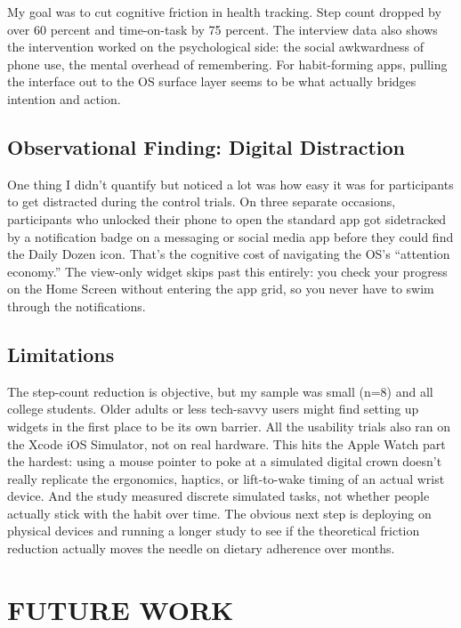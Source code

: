 \documentclass[10pt,twocolumn]{article}
\begin{document}
My goal was to cut cognitive friction in health tracking. Step count dropped by over 60 percent and time-on-task by 75 percent. The interview data also shows the intervention worked on the psychological side: the social awkwardness of phone use, the mental overhead of remembering. For habit-forming apps, pulling the interface out to the OS surface layer seems to be what actually bridges intention and action.

\subsection{Observational Finding: Digital Distraction}

One thing I didn't quantify but noticed a lot was how easy it was for participants to get distracted during the control trials. On three separate occasions, participants who unlocked their phone to open the standard app got sidetracked by a notification badge on a messaging or social media app before they could find the Daily Dozen icon. That's the cognitive cost of navigating the OS's ``attention economy.''\cite{HayesSirensCall} The view-only widget skips past this entirely: you check your progress on the Home Screen without entering the app grid, so you never have to swim through the notifications.

\subsection{Limitations}

The step-count reduction is objective, but my sample was small (n=8) and all college students. Older adults or less tech-savvy users might find setting up widgets in the first place to be its own barrier. All the usability trials also ran on the Xcode iOS Simulator, not on real hardware. This hits the Apple Watch part the hardest: using a mouse pointer to poke at a simulated digital crown doesn't really replicate the ergonomics, haptics, or lift-to-wake timing of an actual wrist device. And the study measured discrete simulated tasks, not whether people actually stick with the habit over time. The obvious next step is deploying on physical devices and running a longer study to see if the theoretical friction reduction actually moves the needle on dietary adherence over months.

\section{FUTURE WORK}
\end{document}
